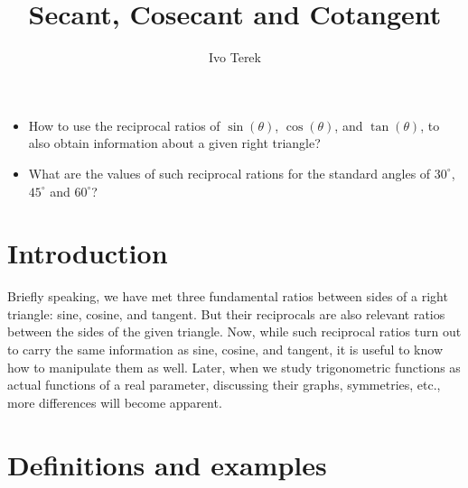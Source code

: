 \documentclass{ximera}
\author{Ivo Terek}
\title{Secant, Cosecant and Cotangent}
\begin{document}
\begin{abstract}
  
\end{abstract}
\maketitle



\begin{motivatingQuestions}\begin{itemize}
\item How to use the reciprocal ratios of $\sin(\theta)$, $\cos(\theta)$, and $\tan(\theta)$, to also obtain information about a given right triangle?
\item What are the values of such reciprocal rations for the standard angles of $30^\circ$, $45^\circ$ and $60^\circ$?
\end{itemize}\end{motivatingQuestions}



\section{Introduction}

Briefly speaking, we have met three fundamental ratios between sides of a right triangle: sine, cosine, and tangent. But their reciprocals are also relevant ratios between the sides of the given triangle. Now, while such reciprocal ratios turn out to carry the same information as sine, cosine, and tangent, it is useful to know how to manipulate them as well. Later, when we study trigonometric functions as actual functions of a real parameter, discussing their graphs, symmetries, etc., more differences will become apparent.


\section{Definitions and examples}
\end{document}

